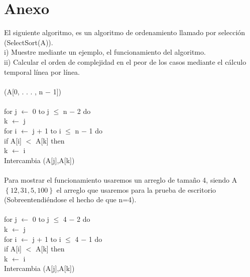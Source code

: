 \documentclass[12pt,twoside]{article}
\begin{document}
\section{Anexo}
El siguiente algoritmo, es un algoritmo de ordenamiento llamado por selecci\'on (SelectSort(A)).\\
i) Muestre mediante un ejemplo, el funcionamiento del algoritmo.\\
ii) Calcular el orden de complejidad en el peor de los casos mediante el c\'alculo temporal l\'inea por l\'inea.\\\\
\hspace*{1cm}{\bf Select-Sort}(A[0, . . . , n $-$ 1])\\\\
\hspace*{2cm}for j $\leftarrow$ 0 to j $\leq$ n $-$ 2 do\\
\hspace*{3cm}k $\leftarrow$ j\\
\hspace*{4cm}for i $\leftarrow$ j + 1 to i $\leq$ n $-$ 1 do\\
\hspace*{5cm}if A[i] $<$ A[k] then\\
\hspace*{6cm}k $\leftarrow$ i\\
\hspace*{3cm}Intercambia (A[j],A[k])\\\\
Para mostrar el funcionamiento usaremos un arreglo de tama\~{n}o 4, siendo A$\left\lbrace12, 31, 5, 100\right\rbrace$ el arreglo que usaremos para la prueba de escritorio (Sobreentendi\'endose el hecho de que n=4).\\\\
\hspace*{2cm}for j $\leftarrow$ 0 to j $\leq$ 4 $-$ 2 do\\
\hspace*{3cm}k $\leftarrow$ j\\
\hspace*{4cm}for i $\leftarrow$ j + 1 to i $\leq$ 4 $-$ 1 do\\
\hspace*{5cm}if A[i] $<$ A[k] then\\
\hspace*{6cm}k $\leftarrow$ i\\
\hspace*{3cm}Intercambia (A[j],A[k])\\\\
\end{document}
